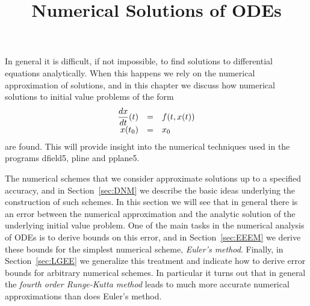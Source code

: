 \documentclass{ximera}
\title{Numerical Solutions of ODEs}
\begin{document}
\begin{abstract}
\end{abstract}
\maketitle


\label{ch:NumSolODE}

\normalsize

In general it is difficult, if not impossible, to find solutions to 
differential equations analytically.   When this happens we rely on the
numerical approximation of solutions, and in this chapter we discuss 
how numerical solutions to initial value 
problems of the form
\arraystart
\[
\begin{array}{rcl}
\displaystyle\frac{dx}{dt}(t) & = & f(t,x(t)) \\
x(t_0) & = & x_0
\end{array}
\]
\arrayfinish
are found.  This will provide insight into the numerical
techniques used in the \Matlab programs {\sf dfield5},
{\sf pline} and {\sf pplane5}.

The numerical schemes that we consider approximate 
solutions up to a specified accuracy, and
in Section~\ref{sec:DNM} we describe the basic ideas
underlying the construction of such schemes.  In this
section we will see that in general there is an error between 
the numerical approximation and the analytic solution
of the underlying initial value problem.  One of the main
tasks in the numerical analysis of ODEs is to derive bounds
on this error, and in Section~\ref{sec:EEEM} we derive these bounds
for the simplest numerical scheme, {\em Euler's method}.  Finally, 
in Section~\ref{sec:LGEE}
we generalize this treatment and indicate how to derive error 
bounds for arbitrary numerical schemes.  In particular it
turns out that in general the {\em fourth order Runge-Kutta method\/}
leads to much more accurate numerical approximations than 
does Euler's method.
\end{document}
